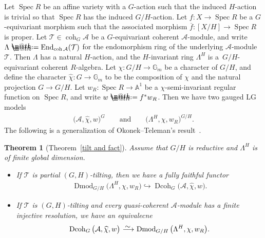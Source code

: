 \documentclass[10pt,a4paper]{amsart}
\makeatletter
\newtheorem{thm}[dfn]{Theorem}
\newcommand*{\defeq}{\mathrel{\rlap{%
 \raisebox{0.3ex}{$\m@th\cdot$}}%
 \raisebox{-0.3ex}{$\m@th\cdot$}}%
 =}
\numberwithin{equation}{section}
\newcommand{\Dmod}{\operatorname{Dmod}}
\newcommand{\Dcoh}{\operatorname{Dcoh}}
\newcommand{\Spec}{\operatorname{Spec}}
\newcommand{\End}{\operatorname{End}}
\newcommand{\coh}{\operatorname{coh}}
\newcommand{\cA}{\mathcal{A}}
\newcommand{\cT}{\mathcal{T}}
\newcommand{\bA}{\mathbb{A}}
\newcommand{\bG}{\mathbb{G}}
\newcommand{\simto}{\,\,\,\,\raisebox{4pt}{$\sim$}{\kern -1.1em \longrightarrow}\,}
\newcommand{\hookto}{\hookrightarrow}
\makeatother
\begin{document}
Let $\Spec R$ be an affine variety with a $G$-action such that the induced $H$-action is trivial so that $\Spec R$ has the induced $G/H$-action.
Let $f\colon X\to \Spec R$ be a $G$-equivariant morphism such that the associated morphism $\overline{f}\colon[X/H]\to \Spec R$ is proper. Let $\cT\in \coh_G\cA$ be a $G$-equivariant coherent $\cA$-module, and write $\Lambda\defeq\End_{\coh\cA}(\cT)$ for the endomorphism ring of the underlying $\cA$-module $\cT$. Then $\Lambda$ has a natural $H$-action, and the $H$-invariant ring $\Lambda^H$ is a~$G/H$-equivariant coherent $R$-algebra.
Let $\chi\colon G/H\to \bG_m$ be a character of $G/H$, and define the character $\widehat{\chi}\colon G\to \bG_m$ to be the composition of $\chi$ and the natural projection $G\to G/H$. Let $w_R\colon \Spec R\to \bA^1$ be a $\chi$-semi-invariant regular function on $\Spec R$, and write $w\defeq f^*w_R$. Then we have two gauged LG models
\begin{gather*}
\big(\cA,\widehat{\chi},w\big)^G \qquad\text{and}\qquad \big(\Lambda^H,\chi,w_R\big)^{G/H}.
\end{gather*}
The following is a generalization of Okonek--Teleman's result~\cite[Theorem~1.11]{ot}.
\begin{thm}[Theorem~\ref{tilt and fact}]\label{main intro}
Assume that $G/H$ is reductive and $\Lambda^H$ is of finite global dimension.
\begin{itemize}\itemsep=0pt
\item[$1.$] If $\cT$ is partial $(G,H)$-tilting, then we have a fully faithful functor
\begin{gather*}
\Dmod_{G/H}\big(\Lambda^H,\chi,w_R\big)\hookto\Dcoh_{G}\big(\cA,\widehat{\chi},w\big).
\end{gather*}
\item[$2.$] If $\cT$ is $(G,H)$-tilting and every quasi-coherent $\cA$-module has a finite injective resolution, we have an equivalecne
\begin{gather*}
\Dcoh_{G}\big(\cA,\widehat{\chi},w\big)\simto\Dmod_{G/H}\big(\Lambda^H,\chi,w_R\big).
\end{gather*}
\end{itemize}
\end{thm}
\end{document}
